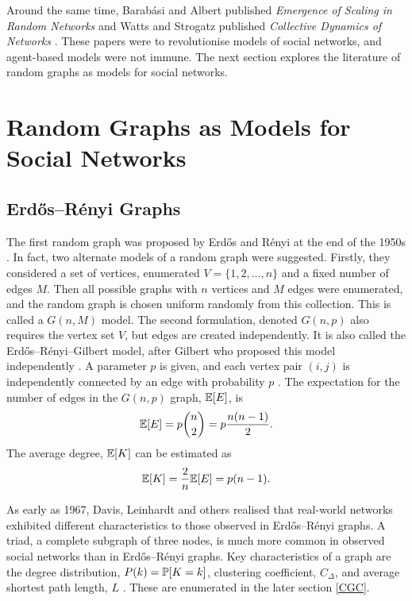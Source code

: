  Around the same time, Barab\'{a}si and Albert published \emph{Emergence of Scaling in Random Networks} \cite{RN55} and Watts and Strogatz published \emph{Collective Dynamics of  Networks} \cite{RN58}. These papers were to revolutionise models of social networks, and agent-based models were not immune. The next section explores the literature of random graphs as models for social networks. \\
 
 \section{Random Graphs as Models for Social Networks} \label{RG}
 
 \subsection{Erd\H{o}s--R\'enyi Graphs}
 The first random graph was proposed by Erd\H{o}s and R\'enyi at the end of the 1950s \cite{RN53}. In fact, two alternate models of a random graph were suggested. Firstly, they considered a set of vertices, enumerated $V = \{1,2,\dots,n\}$ and a fixed number of edges $M$. Then all possible graphs with $n$ vertices and $M$ edges were enumerated, and the random graph is chosen uniform randomly from this collection. This is called a $G(n,M)$ model. The second formulation, denoted $G(n,p)$ also requires the vertex set $V$, but edges are created independently. It is also called the Erd\H{o}s--R\'enyi--Gilbert model, after Gilbert who proposed this model independently \cite{RN64}. A parameter $p$ is given, and each vertex pair $(i,j)$ is independently connected by an edge with probability $p$ \cite{RN56}. The expectation for the number of edges in the $G(n,p)$ graph, $\mathbb E [E]$, is \\
 \begin{align*}
     \mathbb E [E] = p {n \choose 2} = p\frac{n(n-1)}{2}.
 \end{align*}The average degree, $\mathbb E [K]$ can be estimated as \\
 \begin{align*}
     \mathbb E [K] = \frac{2}{n} \mathbb E [E] = p(n-1).
 \end{align*}
 
 As early as 1967, Davis, Leinhardt and others \cite{RN64} realised that real-world networks exhibited different characteristics to those observed in Erd\H{o}s--R\'enyi graphs. A triad, a complete subgraph of three nodes, is much more common in observed social networks than in Erd\H{o}s--R\'enyi graphs. Key characteristics of a graph are the degree distribution, $P(k) = \mathbb P [K=k]$, clustering coefficient, $C_\Delta$, and average shortest path length, $L$ \cite{RN53}. These are enumerated in the later section \ref{CGC}. \\
 
